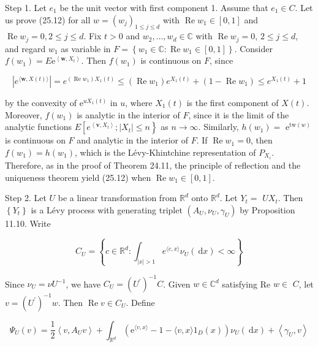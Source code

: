 \documentclass[a4paper,12pt]{article}
\begin{document}
Step 1. Let $e_{1}$ be the unit vector with first component 1. Assume that $e_{1} \in C$. Let us prove (25.12) for all $w=\left(w_{j}\right)_{1 \leq j \leq d}$ with $\operatorname{Re} w_{1} \in[0,1]$ and\\
$\operatorname{Re} w_{j}=0,2 \leq j \leq d$. Fix $t>0$ and $w_{2}, \ldots, w_{d} \in \mathbb{C}$ with $\operatorname{Re} w_{j}=0$, $2 \leq j \leq d$, and regard $w_{1}$ as variable in $F=\left\{w_{1} \in \mathbb{C}: \operatorname{Re} w_{1} \in[0,1]\right\}$. Consider $f\left(w_{1}\right)=E \mathrm{e}^{\left\langle\boldsymbol{w}, X_{t}\right\rangle}$. Then $f\left(w_{1}\right)$ is continuous on $F$, since

$$
    \left|e^{\langle\boldsymbol{w}, X(t)\rangle}\right|=e^{\left(\operatorname{Re} w_{1}\right) X_{1}(t)} \leq\left(\operatorname{Re} w_{1}\right) e^{X_{1}(t)}+\left(1-\operatorname{Re} w_{1}\right) \leq e^{X_{1}(t)}+1
$$

by the convexity of $\mathrm{e}^{u X_{1}(t)}$ in $u$, where $X_{1}(t)$ is the first component of $X(t)$. Moreover, $f\left(w_{1}\right)$ is analytic in the interior of $F$, since it is the limit of the analytic functions $E\left[e^{\left\langle\boldsymbol{v}, X_{t}\right\rangle} ;\left|X_{t}\right| \leq n\right\}$ as $n \rightarrow \infty$. Similarly, $h\left(w_{1}\right)=$ $\mathrm{e}^{\mathrm{tw}(w)}$ is continuous on $F$ and analytic in the interior of $F$. If $\operatorname{Re} w_{1}=0$, then $f\left(w_{1}\right)=h\left(w_{1}\right)$, which is the Lévy-Khintchine representation of $P_{X_{i}}$. Therefore, as in the proof of Theorem 24.11, the principle of reflection and the uniqueness theorem yield (25.12) when $\operatorname{Re} w_{1} \in[0,1]$.

Step 2. Let $U$ be a linear transformation from $\mathbb{R}^{d}$ onto $\mathbb{R}^{d}$. Let $Y_{t}=$ $U X_{t}$. Then $\left\{Y_{t}\right\}$ is a Lévy process with generating triplet $\left(A_{U}, \nu_{U}, \gamma_{U}\right)$ by Proposition 11.10. Write

$$
    C_{U}=\left\{c \in \mathbb{R}^{d}: \int_{|x|>1} e^{\langle c, x\rangle} \nu_{U}(\mathrm{~d} x)<\infty\right\}
$$

Since $\nu_{U}=\nu U^{-1}$, we have $C_{U}=\left(U^{\prime}\right)^{-1} C$. Given $w \in \mathbb{C}^{d}$ satisfying Re $w \in$ $C$, let $v=\left(U^{\prime}\right)^{-1} w$. Then $\operatorname{Re} v \in C_{U}$. Define

$$
    \Psi_{U}(v)=\frac{1}{2}\left\langle v, A_{U} v\right\rangle+\int_{\mathbb{R}^{d}}\left(\mathrm{e}^{\langle v, x\rangle}-1-\langle v, x\rangle 1_{D}(x)\right) \nu_{U}(\mathrm{~d} x)+\left\langle\gamma_{U}, v\right\rangle
$$
\end{document}

